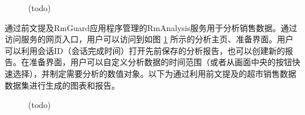 \begin{figure}[htbp]
    \centering
	\caption{(todo)}
	\label{fig:aly-core}
\end{figure}

通过前文提及RmGuard应用程序管理的RmAnalysis服务用于分析销售数据。通过访问服务的网页入口，用户可以访问到如图 \ref{fig:aly-core} 所示的分析主页、准备界面。用户可以利用会话ID（会话完成时间）打开先前保存的分析报告，也可以创建新的报告。在准备界面，用户可以自定义分析数据的时间范围（或者从画面中央的按钮快速选择），并制定需要分析的数值对象。以下为通过利用前文提及的超市销售数据数据集进行生成的图表和报告。

\begin{figure}[htbp]
	\caption{(todo)}
	\label{fig:aly-demo-a}
\end{figure}

